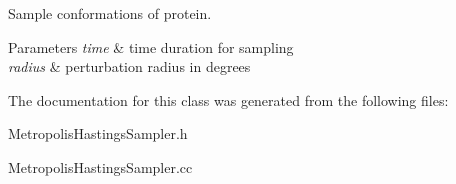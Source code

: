 Sample conformations of protein. 


\begin{DoxyParams}{Parameters}
{\em time} & time duration for sampling \\
\hline
{\em radius} & perturbation radius in degrees \\
\hline
\end{DoxyParams}


The documentation for this class was generated from the following files\-:\begin{DoxyCompactItemize}
\item 
Metropolis\-Hastings\-Sampler.\-h\item 
Metropolis\-Hastings\-Sampler.\-cc\end{DoxyCompactItemize}
